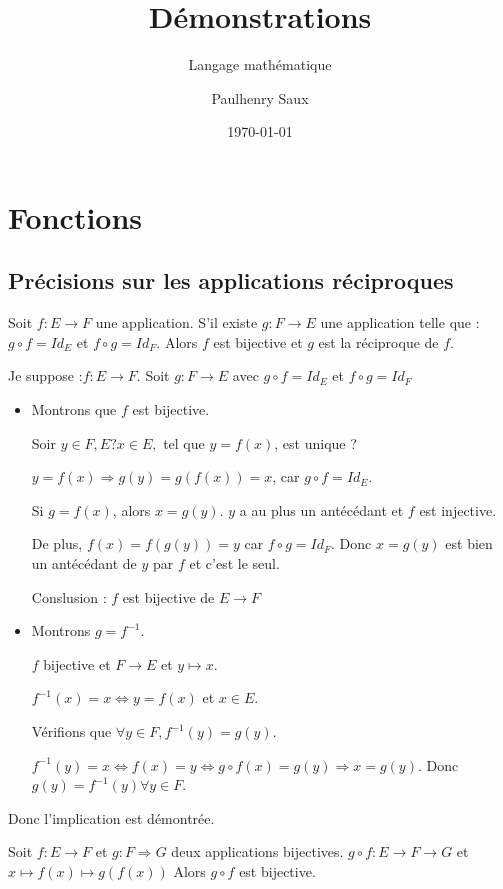 \documentclass[french]{yLectureNote}
\title{Démonstrations}
\subtitle{Langage mathématique}
\author{Paulhenry Saux}
\date{\today}
\begin{document}
\setcounter{chapter}{2}

	\chapter{Fonctions}
\section{Précisions sur les applications réciproques}


\begin{theorem}[Proposition]
Soit $f : E\rightarrow F$ une application. S'il existe $g : F\rightarrow E$ une application telle que : $g\circ f = Id_E$ et $ f\circ g = Id_F$. Alors $f$ est bijective et $g$ est la réciproque de $f$.
\end{theorem}

\begin{myproof}[]
Je suppose :$f:E\rightarrow F$. Soit $g : F\rightarrow E$ avec $g\circ f = Id_E$ et $ f\circ g = Id_F$
\begin{itemize}
 \item Montrons que $f$ est bijective.

Soir $y\in F, E? x\in E,$ tel que $y=f(x)$, est unique ?

$y = f(x) \Rightarrow g(y) = g(f(x)) = x$, car $g\circ f = Id_E$.

Si $g=f(x)$, alors  $x=g(y)$. $y$ a au plus un antécédant et $f$ est injective.

De plus, $f(x) = f(g(y)) = y$ car $f\circ g = Id_F$. Donc $x = g(y)$ est bien un antécédant de $y$ par $f$ et c'est le seul.

Conslusion : $f$ est bijective de $E \rightarrow F$

\item Montrons $g=f^{-1}$.

$f$ bijective et $F \rightarrow E$ et $y \longmapsto x$.

$f^{-1}(x) = x \iff y = f(x)$ et $x\in E$.

Vérifions que $\forall y \in F, f^{-1}(y) = g(y)$.

$f^{-1}(y)=x \iff f(x) = y \iff g\circ f(x) = g(y) \Rightarrow x = g(y)$. Donc $g(y) = f^{-1}(y) \forall y\in F$.
\end{itemize}
Donc l'implication est démontrée.

\end{myproof}
\begin{theorem}[Proposition]
Soit $f : E\rightarrow F$ et $g : F\Rightarrow G$ deux applications bijectives. $g\circ f : E\rightarrow F \rightarrow G$ et $x \longmapsto f(x) \longmapsto g(f(x))$ Alors $g\circ f$ est bijective.
\end{theorem}
\end{document}
